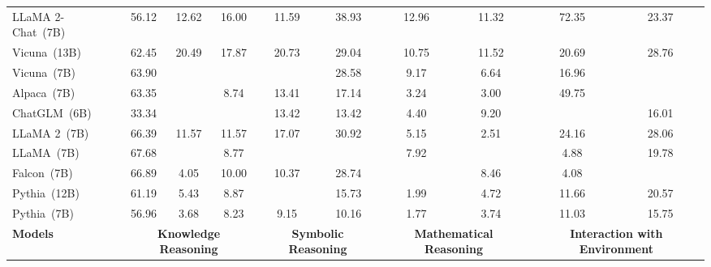 \begin{table*}[htb]
{\begin{tabular}{lccccccccc}
\midrule
LLaMA 2-Chat~(7B) & 56.12 & 12.62 & \cellcolor[HTML]{A7CBE2}16.00 & 11.59 & \cellcolor[HTML]{92BFDB}38.93 & \cellcolor[HTML]{92BFDB}12.96 & \cellcolor[HTML]{A7CBE2}11.32 & \cellcolor[HTML]{92BFDB}72.35 & 23.37 \\
Vicuna~(13B) & 62.45 & \cellcolor[HTML]{A7CBE2}20.49 & \cellcolor[HTML]{92BFDB}17.87 & \cellcolor[HTML]{92BFDB}20.73 & \cellcolor[HTML]{C4DDEC}29.04 & \cellcolor[HTML]{C6DEED}10.75 & \cellcolor[HTML]{92BFDB}11.52 & \cellcolor[HTML]{E5F0F7}
20.69 & \cellcolor[HTML]{92BFDB}28.76 \\
Vicuna~(7B) & \cellcolor[HTML]{C4DDEC}63.90 & \cellcolor[HTML]{C6DEED}{19.95} & \cellcolor[HTML]{C6DEED}{13.59} & \cellcolor[HTML]{A7CBE2}{17.07} & 28.58 & \cellcolor[HTML]{C4DDEC}9.17 & 6.64 & 16.96 & \cellcolor[HTML]{C6DEED}{26.95} \\
Alpaca~(7B) & \cellcolor[HTML]{E5F0F7}63.35 & \cellcolor[HTML]{92BFDB}{21.52} & {8.74} & {13.41} & 17.14 & 3.24 & 3.00 & \cellcolor[HTML]{C6DEED}49.75 & \cellcolor[HTML]{C4DDEC}{26.05}\\
ChatGLM~(6B) & 33.34 & \cellcolor[HTML]{C4DDEC}{16.58} & \cellcolor[HTML]{C4DDEC}{13.48} & {13.42} & 13.42 & 
4.40 & \cellcolor[HTML]{C4DDEC}9.20 & \cellcolor[HTML]{A7CBE2}{55.39} & {16.01} \\
\midrule
LLaMA 2~(7B) & \cellcolor[HTML]{C6DEED}66.39 & 11.57 & \cellcolor[HTML]{E5F0F7}11.57 & \cellcolor[HTML]{A7CBE2}17.07 & \cellcolor[HTML]{C6DEED}30.92 & 5.15 & 2.51 & \cellcolor[HTML]{C4DDEC}24.16 & \cellcolor[HTML]{A7CBE2}28.06\\
LLaMA~(7B) & \cellcolor[HTML]{92BFDB}67.68 & \cellcolor[HTML]{E5F0F7}{13.84} & {8.77} & \cellcolor[HTML]{C4DDEC}{15.24} & \cellcolor[HTML]{A7CBE2}{34.62} & \cellcolor[HTML]{E5F0F7}7.92 & \cellcolor[HTML]{C6DEED}{11.12} & 4.88 & {19.78} \\
Falcon~(7B) & \cellcolor[HTML]{A7CBE2}66.89 & {4.05} & {10.00} & {10.37} & \cellcolor[HTML]{E5F0F7}28.74 & \cellcolor[HTML]{A7CBE2}{10.78} & \cellcolor[HTML]{E5F0F7}8.46 & 4.08 & \cellcolor[HTML]{E5F0F7}{23.91} \\
Pythia~(12B) & 61.19 & {5.43} & {8.87} & \cellcolor[HTML]{E5F0F7}{14.63} & 15.73 &
1.99 & 4.72 & 11.66 & {20.57} \\
Pythia~(7B) & 56.96 & {3.68} & {8.23} & {9.15} & 10.16 & 1.77 & 3.74 & 11.03 & {15.75}\\
\midrule[0.8pt]
\multirow{2.5}{*}{\textbf{Models}} & \multicolumn{3}{c}{\textbf{Knowledge Reasoning}} & \multicolumn{2}{c}{\textbf{Symbolic Reasoning}} & \multicolumn{2}{c}{\textbf{Mathematical Reasoning}} & \multicolumn{2}{c}{\textbf{Interaction with Environment}}\\ 

\end{tabular}}
\end{table*}
